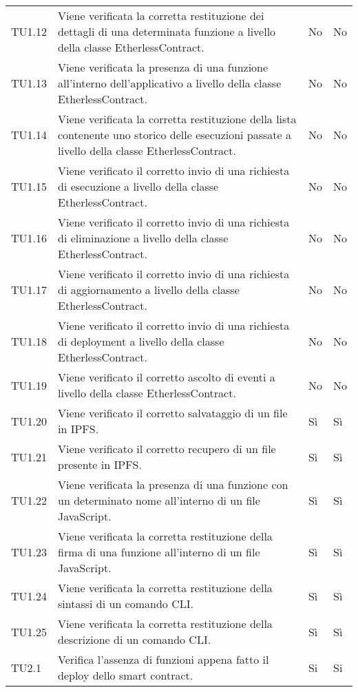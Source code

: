 \begin{longtable}{
		>{\centering}p{}
		>{}p{}
		>{\centering}p{}
		>{\centering}p{} }
		TU1.12 &
		Viene verificata la corretta restituzione dei dettagli di una determinata funzione a livello della classe EtherlessContract. &
		No &
		No \tabularnewline

		TU1.13 &
		Viene verificata la presenza di una funzione all’interno dell’applicativo a livello della classe EtherlessContract. &
		No &
		No \tabularnewline

		TU1.14 &
		Viene verificata la corretta restituzione della lista contenente uno storico delle esecuzioni passate a livello della classe EtherlessContract. &
		No &
		No \tabularnewline

		TU1.15 &
		Viene verificato il corretto invio di una richiesta di esecuzione a livello della classe EtherlessContract. &
		No &
		No \tabularnewline

		TU1.16 &
		Viene verificato il corretto invio di una richiesta di eliminazione a livello della classe EtherlessContract. &
		No &
		No \tabularnewline

		TU1.17 &
		Viene verificato il corretto invio di una richiesta di aggiornamento a livello della classe EtherlessContract. &
		No &
		No \tabularnewline

		TU1.18 &
		Viene verificato il corretto invio di una richiesta di deployment a livello della classe EtherlessContract. &
		No &
		No \tabularnewline

		TU1.19 &
		Viene verificato il corretto ascolto di eventi a livello della classe EtherlessContract. &
		No &
		No \tabularnewline

		TU1.20 &
		Viene verificato il corretto salvataggio di un file in IPFS. &
		Sì &
		Sì \tabularnewline

		TU1.21 &
		Viene verificato il corretto recupero di un file presente in IPFS. &
		Sì &
		Sì \tabularnewline

		TU1.22 &
		Viene verificata la presenza di una funzione con un determinato nome all’interno di un file JavaScript. &
		Sì &
		Sì \tabularnewline

		TU1.23 &
		Viene verificata la corretta restituzione della firma di una funzione all’interno di un file JavaScript. &
		Sì &
		Sì \tabularnewline

		TU1.24 &
		Viene verificata la corretta restituzione della sintassi di un comando CLI. &
		Sì &
		Sì \tabularnewline

		TU1.25 &
		Viene verificata la corretta restituzione della descrizione di un comando CLI. &
		Sì &
		Sì \tabularnewline
		
		
TU2.1   &  Verifica l'assenza di funzioni appena fatto il deploy dello smart contract. &
Si & Si \tabularnewline


\end{longtable}
